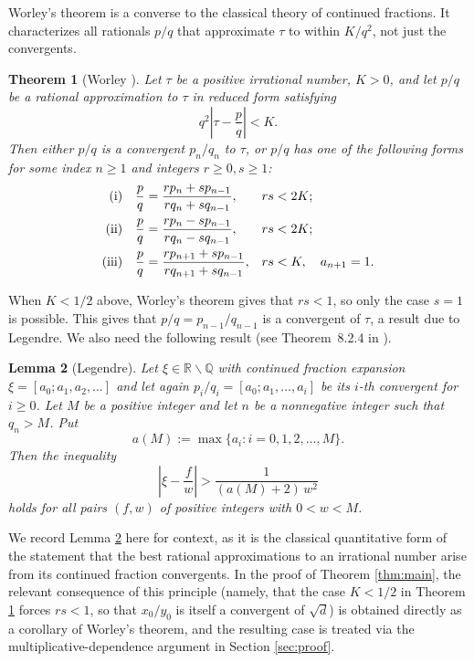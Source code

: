 \documentclass[11pt,a4paper]{article}
\newtheorem{theorem}{Theorem}[section]
\newtheorem{lemma}[theorem]{Lemma}
\numberwithin{equation}{section}
\numberwithin{table}{section}
\numberwithin{figure}{section}
\begin{document}
Worley's theorem \cite{Worley1981} is a converse to the classical theory of continued fractions. It characterizes all rationals  $p/q$ that approximate $\tau$ to within $K/q^2$, not just the convergents.

\begin{theorem}[Worley \cite{Worley1981}]\label{thm:Worley}
	Let $\tau$ be a positive irrational number, $K>0$, 
	and let $p/q$ be a rational approximation to $\tau$ in reduced form 
	satisfying
	\begin{equation*}
		q^{2}\left|\tau - \frac{p}{q}\right| < K.
	\end{equation*}
	Then either $p/q$ is a convergent $p_n/q_n$ to $\tau$, or $p/q$ has one of the following forms for some index $n \geq 1$ and integers $r\ge 0, s\ge 1$:
	\begin{align*}
		\text{\rm(i)}\quad  &\frac{p}{q} = \frac{rp_n + sp_{n-1}}{rq_n + sq_{n-1}},
		&rs &< 2K;\\
		\text{\rm(ii)}\quad &\frac{p}{q} = \frac{rp_n - sp_{n-1}}{rq_n - sq_{n-1}},
		&rs &< 2K;\\
		\text{\rm(iii)}\quad &\frac{p}{q} = \frac{rp_{n+1} + sp_{n-1}}{rq_{n+1} 
			+ sq_{n-1}}, &rs &< K,\quad a_{n+1} = 1.
	\end{align*}
\end{theorem}

When $K<1/2$ above, Worley's theorem gives that $rs<1$, so only the case $s=1$ is possible. This gives that $p/q=p_{n-1}/q_{n-1}$ is a convergent of $\tau$, a result due to Legendre. 
We also need the following result (see Theorem~8.2.4 in \cite{ME}).

\begin{lemma}[Legendre]\label{lem:Legendre}
	Let $\xi\in {\mathbb R}\backslash {\mathbb Q}$ with continued fraction expansion
	$\xi = [a_0; a_1, a_2, \ldots]$ and let again
	$p_i/q_i = [a_0; a_1, \ldots, a_i]$ be its $i$-th convergent for $i\ge 0$.  Let $M$ be a positive integer and let $n$ be a nonnegative integer such that $q_n> M$. Put
	$$
	a(M) := \max\{a_i : i = 0, 1, 2, \ldots, M\}.
	$$
	Then the inequality
	$$
	\left|\xi - \frac{f}{w}\right| > \frac{1}{(a(M)+2)\,w^2}
	$$
	holds for all pairs $(f, w)$ of positive integers with $0 < w < M$.
\end{lemma}
We record Lemma \ref{lem:Legendre} here for context, as it is the classical quantitative form of the statement that the best rational approximations to an irrational number arise from its continued fraction convergents. In the proof of Theorem \ref{thm:main}, the relevant consequence of this principle (namely, that the case $K<1/2$ in Theorem \ref{thm:Worley} forces $rs<1$, so that $x_0/y_0$ is itself a convergent of $\sqrt{d}$) is obtained directly as a
corollary of Worley's theorem, and the resulting case is treated via the multiplicative-dependence argument in Section \ref{sec:proof}.
\end{document}
